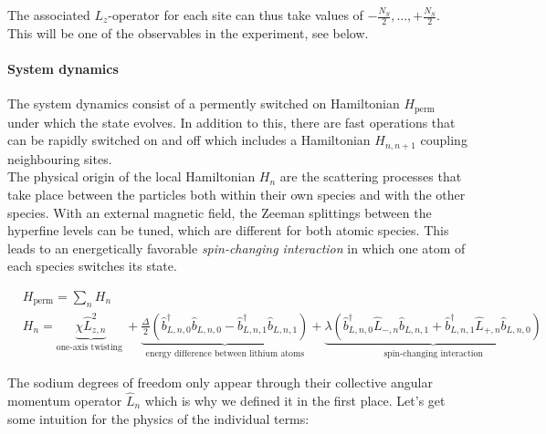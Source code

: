 \documentclass[a4paper, 10pt]{article}
\begin{document}
     The associated $L_z$-operator for each site can thus take values of $-\frac{N_S}{2}, ..., +\frac{N_S}{2}$. This will be one of the observables in the experiment, see below. 
    
    \paragraph{System dynamics} The system dynamics consist of a permently switched on Hamiltonian $H_{\text{perm}}$ under which the state evolves.
    In addition to this, there are fast operations that can be rapidly switched on and off which includes a Hamiltonian $H_{n, n+1}$ coupling neighbouring sites. \\
    
    \noindent The physical origin of the local Hamiltonian $H_n$ are the scattering processes that take place between the particles both within their own species and with the other species.
    With an external magnetic field, the Zeeman splittings between the hyperfine levels can be tuned, which are different for both atomic species.
    This leads to an energetically favorable \emph{spin-changing interaction} in which one atom of each species switches its state.
    
    \begin{align}
        \label{eq:mixture_Hailtonian_full}
        &H_{\text{perm}} = \sum_n  H_n  \\
        &H_n = \underbrace{ \chi \hat{L}_{z,n}^2}_{\text{one-axis twisting }} 
        + \underbrace{\frac{\Delta}{2} \left( \hat{b}_{L, n , 0}^\dagger \hat{b}_{L, n , 0} - \hat{b}_{L, n , 1}^\dagger \hat{b}_{L, n , 1}\right)}_{\text{energy difference between lithium atoms}}
        + \underbrace{ \lambda \left(  \hat{b}_{L, n , 0}^\dagger \hat{L}_{-, n} \hat{b}_{L, n , 1} + \hat{b}_{L, n , 1}^\dagger \hat{L}_{+, n} \hat{b}_{L, n , 0} \right)}_{\text{spin-changing interaction}}
    \end{align}
    
    The sodium degrees of freedom only appear through their collective angular momentum operator $\hat{L}_n$ which is why we defined it in the first place.
    Let's get some intuition for the physics of the individual terms:
    
\end{document}
